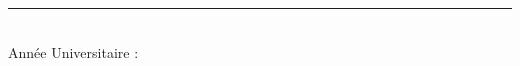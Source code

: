 \begin{titlepage}
\begin{center}
\vfill

\rule{0.6\textwidth}{0.6pt}\\[6pt]
{\large Année Universitaire : \textbf{\@collegeYear}}

\end{center}
\end{titlepage}
\makeatother
